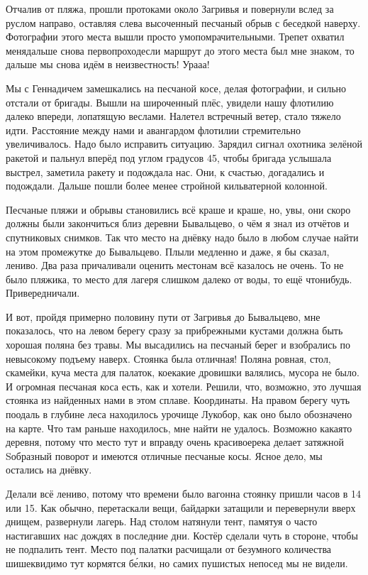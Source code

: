 Отчалив от пляжа, прошли протоками около Загривья и повернули вслед за руслом направо, оставляя слева высоченный песчаный обрыв с беседкой наверху. Фотографии этого места вышли просто умопомрачительными. Трепет охватил меня\mdash дальше снова первопроход\mdash если маршрут до этого места был мне знаком, то дальше мы снова идём в неизвестность! Ура\sdash а\sdash а!

Мы с Геннадичем замешкались на песчаной косе, делая фотографии, и сильно отстали от бригады. Вышли на широченный плёс, увидели нашу флотилию далеко впереди, лопатящую веслами. Налетел встречный ветер, стало тяжело идти. Расстояние между нами и авангардом флотилии стремительно увеличивалось. Надо было исправить ситуацию. Зарядил сигнал охотника зелёной ракетой и пальнул вперёд под углом градусов 45, чтобы бригада услышала выстрел, заметила ракету и подождала нас. Они, к счастью, догадались и подождали. Дальше пошли более менее стройной кильватерной колонной.

Песчаные пляжи и обрывы становились всё краше и краше, но, увы, они скоро должны были закончиться близ деревни Бывальцево, о чём я знал из отчётов и спутниковых снимков. Так что место на днёвку надо было в любом случае найти на этом промежутке до Бывальцево. Плыли медленно и даже, я бы сказал, лениво. Два раза причаливали оценить место\mdash нам всё казалось не очень. То не было пляжика, то место для лагеря слишком далеко от воды, то ещё что\sdash нибудь. Привередничали.

И вот, пройдя примерно половину пути от Загривья до Бывальцево, мне показалось, что на левом берегу сразу за прибрежными кустами должна быть хорошая поляна без травы. Мы высадились на песчаный берег и взобрались по невысокому подъему наверх. Стоянка была отличная! Поляна ровная, стол, скамейки, куча места для палаток, кое\sdash какие дровишки валялись, мусора не было. И огромная песчаная коса есть, как и хотели. Решили, что, возможно, это лучшая стоянка из найденных нами в этом сплаве. Координаты\mdash \CoordsChagodoschaSixteenDnevka. На правом берегу чуть поодаль в глубине леса находилось урочище Лукобор, как оно было обозначено на карте. Что там раньше находилось, мне найти не удалось. Возможно какая\sdash то деревня, потому что место тут и вправду очень красивое\mdash река делает затяжной S\sdash образный поворот и имеются отличные песчаные косы.  Ясное дело, мы остались на днёвку.

Делали всё лениво, потому что времени было вагон\mdash на стоянку пришли часов в 14 или 15. Как обычно, перетаскали вещи, байдарки затащили и перевернули вверх днищем, развернули лагерь. Над столом натянули тент, памятуя о часто настигавших нас дождях в последние дни. Костёр сделали чуть в стороне, чтобы не подпалить тент. Место под палатки расчищали от безумного количества шишек\mdash видимо тут кормятся б\'{е}лки, но самих пушистых непосед мы не видели. 

